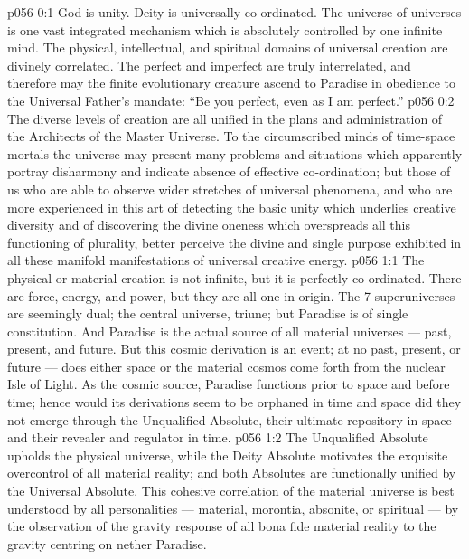 \author{Mighty Messenger and Machiventa Melchizedek}
\vs p056 0:1 God is unity. Deity is universally co\hyp{}ordinated. The universe of universes is one vast integrated mechanism which is absolutely controlled by one infinite mind. The physical, intellectual, and spiritual domains of universal creation are divinely correlated. The perfect and imperfect are truly interrelated, and therefore may the finite evolutionary creature ascend to Paradise in obedience to the Universal Father’s mandate: “Be you perfect, even as I am perfect.”
\vs p056 0:2 The diverse levels of creation are all unified in the plans and administration of the Architects of the Master Universe. To the circumscribed minds of time\hyp{}space mortals the universe may present many problems and situations which apparently portray disharmony and indicate absence of effective co\hyp{}ordination; but those of us who are able to observe wider stretches of universal phenomena, and who are more experienced in this art of detecting the basic unity which underlies creative diversity and of discovering the divine oneness which overspreads all this functioning of plurality, better perceive the divine and single purpose exhibited in all these manifold manifestations of universal creative energy.
\vs p056 1:1 The physical or material creation is not infinite, but it is perfectly co\hyp{}ordinated. There are force, energy, and power, but they are all one in origin. The 7 superuniverses are seemingly dual; the central universe, triune; but Paradise is of single constitution. And Paradise is the actual source of all material universes --- past, present, and future. But this cosmic derivation is an  event; at no  past, present, or future --- does either space or the material cosmos come forth from the nuclear Isle of Light. As the cosmic source, Paradise functions prior to space and before time; hence would its derivations seem to be orphaned in time and space did they not emerge through the Unqualified Absolute, their ultimate repository in space and their revealer and regulator in time.
\vs p056 1:2 \pc The Unqualified Absolute upholds the physical universe, while the Deity Absolute motivates the exquisite overcontrol of all material reality; and both Absolutes are functionally unified by the Universal Absolute. This cohesive correlation of the material universe is best understood by all personalities --- material, morontia, absonite, or spiritual --- by the observation of the gravity response of all bona fide material reality to the gravity centring on nether Paradise.
